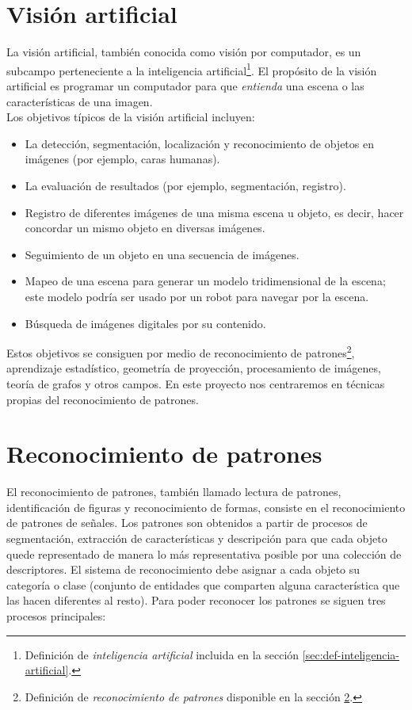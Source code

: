 \section{Visión artificial}
\label{def:visión-artificial}

La visión artificial, también conocida como visión por computador, es un subcampo perteneciente a la inteligencia artificial\footnote{Definición de \emph{inteligencia artificial} incluida en la sección \ref{sec:def-inteligencia-artificial}.}. El propósito de la visión artificial es programar un computador para que \emph{entienda} una escena o las características de una imagen.\\

Los objetivos típicos de la visión artificial incluyen:

\begin{itemize}
\item La detección, segmentación, localización y reconocimiento de objetos en imágenes (por ejemplo, caras humanas).
\item La evaluación de resultados (por ejemplo, segmentación, registro).
\item Registro de diferentes imágenes de una misma escena u objeto, es decir, hacer concordar un mismo objeto en diversas imágenes.
\item Seguimiento de un objeto en una secuencia de imágenes.
\item Mapeo de una escena para generar un modelo tridimensional de la escena; este modelo podría ser usado por un robot para navegar por la escena.
\item Búsqueda de imágenes digitales por su contenido.
\end{itemize}

Estos objetivos se consiguen por medio de reconocimiento de patrones\footnote{Definición de \emph{reconocimiento de patrones} disponible en la sección \ref{def:reconocimiento-de-patrones}.}, aprendizaje estadístico, geometría de proyección, procesamiento de imágenes, teoría de grafos y otros campos. En este proyecto nos centraremos en técnicas propias del reconocimiento de patrones.

\section{Reconocimiento de patrones}
\label{def:reconocimiento-de-patrones}

El reconocimiento de patrones, también llamado lectura de patrones, identificación de figuras y reconocimiento de formas, consiste en el reconocimiento de patrones de señales. Los patrones son obtenidos a partir de procesos de segmentación, extracción de características y descripción para que cada objeto quede representado de manera lo más representativa posible por una colección de descriptores. El sistema de reconocimiento debe asignar a cada objeto su categoría o clase (conjunto de entidades que comparten alguna característica que las hacen diferentes al resto). Para poder reconocer los patrones se siguen tres procesos principales:\\

